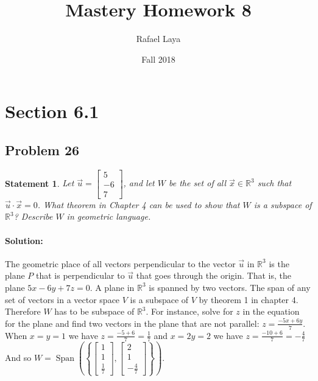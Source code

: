 \documentclass[12pt, letterpaper]{article}
\title{Mastery Homework 8}
\author{Rafael Laya}
\date{Fall 2018}
\newcommand{\R}{\mathbb{R}}
\theoremstyle{statement}
\theoremstyle{statement}
\newtheorem*{atmStat}{Statement}
\newenvironment{Solution}{\noindent\ignorespaces\paragraph{Solution:}}{\hfill \ding{122}\par\noindent}
\begin{document}
    \maketitle

    \section*{Section 6.1}
    \subsection*{Problem 26}
    \begin{atmStat}
    Let $\Vec{u}=\begin{bmatrix} 5\\-6\\7 \end{bmatrix}$, and let $W$ be the set of all $\Vec{x} \in \R^3$ such that $\Vec{u} \cdot \Vec{x}=0$. What theorem in Chapter 4 can be used to show that $W$ is a subspace of $\R^3$? Describe $W$ in geometric language.
    \end{atmStat}
    \begin{Solution}
    The geometric place of all vectors perpendicular to the vector $\Vec{u}$ in $\R^3$ is the plane $P$ that is perpendicular to $\Vec{u}$ that goes through the origin. That is, the plane $5x-6y+7z=0$. A plane in $\R^3$ is spanned by two vectors. The span of any set of vectors in a vector space $V$ is a subspace of $V$ by theorem 1 in chapter 4. Therefore $W$ has to be subspace of $\R^3$. For instance, solve for $z$ in the equation for the plane and find two vectors in the plane that are not parallel: $z = \frac{-5x+6y}{7}$. When $x=y=1$ we have $z=\frac{-5+6}{7}=\frac{1}{7}$ and $x=2y=2$ we have $z=\frac{-10+6}{7}=-\frac{4}{7}$ And so $W = \operatorname{Span}\left(\left\{ \begin{bmatrix} 1\\1\\\frac{1}{7} \end{bmatrix}, \begin{bmatrix} 2\\1\\-\frac{4}{7} \end{bmatrix}\right\}\right)$.
    \end{Solution}
    
\end{document}
